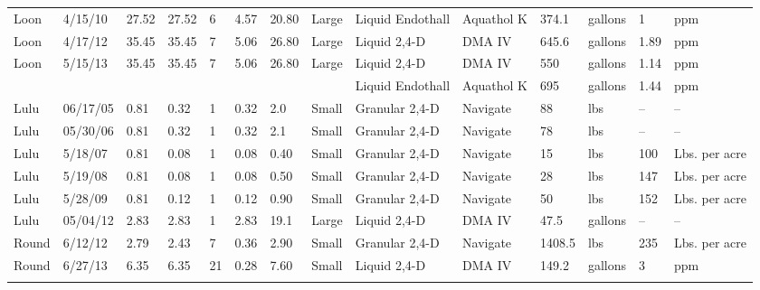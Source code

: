 \documentclass{article}
\begin{document}
\begin{landscape}
\begin{longtable}[l]{lp{14mm}Hp{10mm}HHp{14mm}p{9mm}p{30mm}p{18mm}lp{14mm}p{8mm}l}
  Loon & 4/15/10 & 27.52 & 27.52 &   6 & 4.57 & 20.80 & Large & Liquid Endothall & Aquathol K & 374.1 & gallons & 1 & ppm \\ 
  Loon & 4/17/12 & 35.45 & 35.45 &   7 & 5.06 & 26.80 & Large & Liquid 2,4-D & DMA IV & 645.6 & gallons & 1.89 & ppm \\ 
  Loon & 5/15/13 & 35.45 & 35.45 &   7 & 5.06 & 26.80 & Large & Liquid 2,4-D & DMA IV & 550 & gallons & 1.14 & ppm \\ 
  & & & & & & & & Liquid Endothall & Aquathol K & 695 & gallons & 1.44 & ppm \\ 
  Lulu & 06/17/05 & 0.81 & 0.32 &   1 & 0.32 & 2.0 & Small & Granular 2,4-D & Navigate & 88 & lbs &  -- &  -- \\ 
  Lulu & 05/30/06 & 0.81 & 0.32 &   1 & 0.32 & 2.1 & Small & Granular 2,4-D & Navigate & 78 & lbs &  -- & --  \\ 
  Lulu & 5/18/07 & 0.81 & 0.08 &   1 & 0.08 & 0.40 & Small & Granular 2,4-D & Navigate & 15 & lbs & 100 & Lbs. per acre \\ 
  Lulu & 5/19/08 & 0.81 & 0.08 &   1 & 0.08 & 0.50 & Small & Granular 2,4-D & Navigate & 28 & lbs & 147 & Lbs. per acre \\ 
  Lulu & 5/28/09 & 0.81 & 0.12 &   1 & 0.12 & 0.90 & Small & Granular 2,4-D & Navigate & 50 & lbs & 152 & Lbs. per acre \\ 
  Lulu & 05/04/12 & 2.83 & 2.83 &   1 & 2.83 & 19.1 & Large & Liquid 2,4-D & DMA IV & 47.5 & gallons &  -- & -- \\ 
  Round & 6/12/12 & 2.79 & 2.43 &   7 & 0.36 & 2.90 & Small & Granular 2,4-D & Navigate & 1408.5 & lbs & 235 & Lbs. per acre \\ 
  Round & 6/27/13 & 6.35 & 6.35 &  21 & 0.28 & 7.60 & Small & Liquid 2,4-D & DMA IV & 149.2 & gallons & 3 & ppm \\  

\bottomrule
\\


\end{longtable}
\end{landscape}
\end{document}
